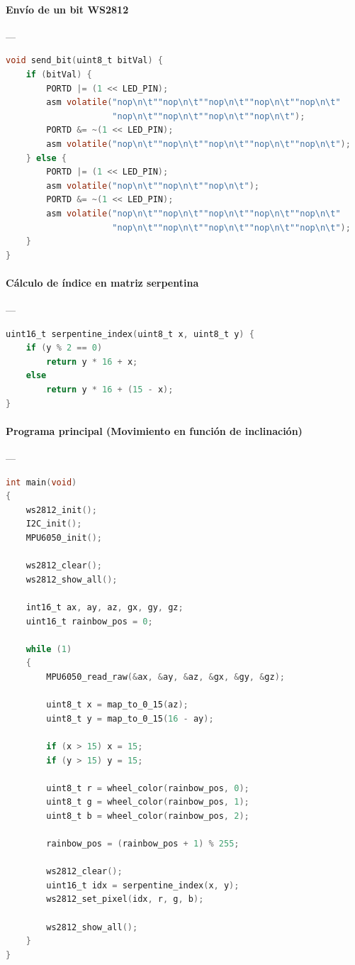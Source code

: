 \paragraph{Envío de un bit WS2812}\label{anexo:WSbit}---
\begin{lstlisting}[language=C, caption={Bit-banging del protocolo WS2812}]
void send_bit(uint8_t bitVal) {
    if (bitVal) {
        PORTD |= (1 << LED_PIN);
        asm volatile("nop\n\t""nop\n\t""nop\n\t""nop\n\t""nop\n\t"
                     "nop\n\t""nop\n\t""nop\n\t""nop\n\t");
        PORTD &= ~(1 << LED_PIN);
        asm volatile("nop\n\t""nop\n\t""nop\n\t""nop\n\t""nop\n\t");
    } else {
        PORTD |= (1 << LED_PIN);
        asm volatile("nop\n\t""nop\n\t""nop\n\t");
        PORTD &= ~(1 << LED_PIN);
        asm volatile("nop\n\t""nop\n\t""nop\n\t""nop\n\t""nop\n\t"
                     "nop\n\t""nop\n\t""nop\n\t""nop\n\t""nop\n\t");
    }
}
\end{lstlisting}

\paragraph{Cálculo de índice en matriz serpentina}\label{anexo:WSserp2}---
\begin{lstlisting}[language=C, caption={Indexación de tipo serpentina}]
uint16_t serpentine_index(uint8_t x, uint8_t y) {
    if (y % 2 == 0)
        return y * 16 + x;
    else
        return y * 16 + (15 - x);
}
\end{lstlisting}

\paragraph{Programa principal (Movimiento en función de inclinación)}\label{anexo:WSmpuMain}---
\begin{lstlisting}[language=C, caption={Main del sistema LED + MPU6050}]
int main(void)
{
    ws2812_init();
    I2C_init();
    MPU6050_init();

    ws2812_clear();
    ws2812_show_all();

    int16_t ax, ay, az, gx, gy, gz;
    uint16_t rainbow_pos = 0;

    while (1)
    {
        MPU6050_read_raw(&ax, &ay, &az, &gx, &gy, &gz);

        uint8_t x = map_to_0_15(az);
        uint8_t y = map_to_0_15(16 - ay);

        if (x > 15) x = 15;
        if (y > 15) y = 15;

        uint8_t r = wheel_color(rainbow_pos, 0);
        uint8_t g = wheel_color(rainbow_pos, 1);
        uint8_t b = wheel_color(rainbow_pos, 2);

        rainbow_pos = (rainbow_pos + 1) % 255;

        ws2812_clear();
        uint16_t idx = serpentine_index(x, y);
        ws2812_set_pixel(idx, r, g, b);

        ws2812_show_all();
    }
}
\end{lstlisting}


